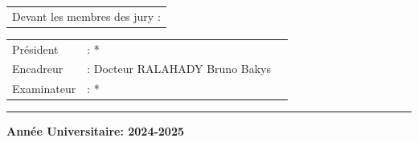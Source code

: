      \begin{tabular}{l}
      \vspace{0.1cm}	
    Devant les membres des jury :
    \end{tabular}
    \begin{center}
        \begin{tabular}{l l l}
        Président &: *\\
        Encadreur &: Docteur  RALAHADY Bruno Bakys\\
        Examinateur &: *
       
    
    \end{tabular}
    \end{center}

\vfill
\rule{\textwidth}{2pt}
\begin{center}
    \textbf{Année Universitaire: 2024-2025}
\end{center}